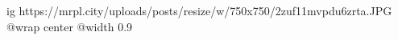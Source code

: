  
 
 
 
 

\ifcmt
  ig https://mrpl.city/uploads/posts/resize/w/750x750/2zuf11mvpdu6zrta.JPG
  @wrap center
  @width 0.9
\fi
